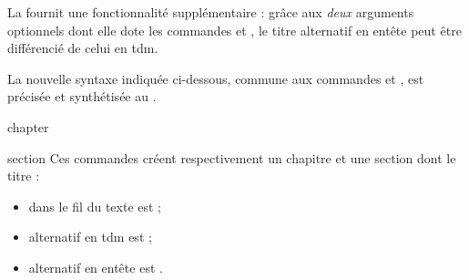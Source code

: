 La \yatCl{} fournit une fonctionnalité supplémentaire : grâce aux \emph{deux}
arguments optionnels dont elle dote les commandes  et
, le titre alternatif en entête peut être différencié de
celui en \gls{tdm}\signet{}.

La nouvelle syntaxe indiquée ci-dessous, commune aux commandes 
et ,
est précisée et synthétisée au .

\begin{docCommand}[doc new=2016-12-08]{chapter}{}
\end{docCommand}
%
\begin{docCommand}[doc new=2016-12-08]{section}{}
  Ces commandes créent respectivement un chapitre et une section dont le titre :
  \begin{itemize}
  \item dans le fil du texte est  ;
  \item alternatif en \gls{tdm}\signet{} est  ;
  \item alternatif en entête est .
  \end{itemize}
\end{docCommand}
%
\begin{table}[htb]
  \centering
  \caption{Usage des (deux arguments optionnels des) commandes
    \protect{} et \protect{}%
  }
  \label{tab-commande-chapter-section}
  
\end{table}

